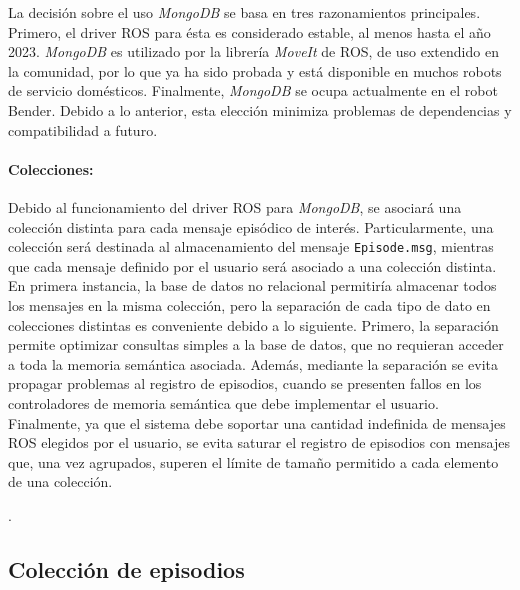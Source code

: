 La decisión sobre el uso \textit{MongoDB} se basa en tres razonamientos principales. Primero, el driver ROS para ésta es considerado estable, al menos hasta el año 2023. \textit{MongoDB} es utilizado por la librería \textit{MoveIt} de ROS, de uso extendido en la comunidad, por lo que ya ha sido probada y está disponible en muchos robots de servicio domésticos. Finalmente, \textit{MongoDB} se ocupa actualmente en el robot Bender. Debido a lo anterior, esta elección minimiza problemas de dependencias y compatibilidad a futuro.



\paragraph{Colecciones:}
Debido al funcionamiento del driver ROS para \textit{MongoDB}, se asociará una colección distinta para cada mensaje episódico de interés. Particularmente, una colección será destinada al almacenamiento del mensaje \texttt{Episode.msg}, mientras que cada mensaje definido por el usuario será  asociado a una colección distinta. En primera instancia, la base de datos no relacional permitiría almacenar todos los mensajes en la misma colección, pero la separación de cada tipo de dato en colecciones distintas es conveniente debido a lo siguiente. Primero, la separación permite optimizar consultas simples a la base de datos, que no requieran acceder a toda la memoria semántica asociada. Además, mediante la separación se evita propagar problemas al registro de episodios, cuando se presenten fallos en los controladores de memoria semántica que debe implementar el usuario. Finalmente, ya que el sistema debe soportar una cantidad indefinida de mensajes ROS elegidos por el usuario, se evita saturar el registro de episodios con mensajes que, una vez agrupados, superen el límite de tamaño permitido a cada elemento de una colección.

.


\subsection{Colección de episodios}

